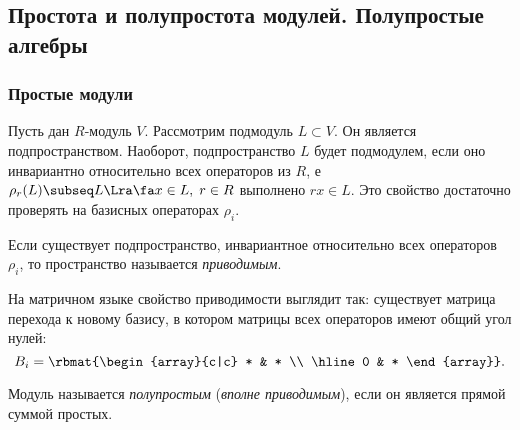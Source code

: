 \documentclass[a4paper]{article}
\begin{document}
\subsection{Простота и полупростота модулей. Полупростые алгебры}

\subsubsection{Простые модули}

Пусть дан $R$-модуль $V$. Рассмотрим подмодуль $L \subset V$. Он является подпространством. Наоборот,
подпространство $L$ будет подмодулем, если оно инвариантно относительно всех операторов из $R$, е
$\rho_r(L) \subseq L \Lra \fa x \in L, \; r \in R$ выполнено $rx \in L$. Это свойство достаточно проверять на
базисных операторах $\rho_i$.

\begin{df}
Если существует подпространство, инвариантное относительно всех операторов $\rho_i$, то пространство
называется \emph{приводимым}.
\end{df}
На матричном языке свойство приводимости выглядит так: существует матрица перехода к новому базису, в
котором матрицы всех операторов имеют общий угол нулей:
$$B_i = \rbmat{\begin{array}{c|c} * & * \\ \hline 0 & * \end{array}}.$$

\begin{df}
Модуль называется \emph{полупростым} (\emph{вполне приводимым}), если он является прямой суммой простых.
\end{df}
\end{document}
